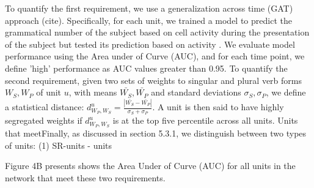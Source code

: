 To quantify the first requirement, we use a generalization across time (GAT) approach (cite). Specifically, for each unit, we trained a model to predict the grammatical number of the subject based on cell activity during the presentation of the subject but tested its prediction based on activity . We evaluate model performance using the Area under of Curve (AUC), and for each time point, we define 'high' performance as AUC values greater than 0.95. To quantify the second requirement, given two sets of weights to singular and plural verb forms $W_S, W_P$ of unit $u$, with means $\bar{W_S}, \bar{W_P}$ and standard deviations $\sigma_S, \sigma_P$, we define a statistical distance: $d^u_{W_P, W_S}=\frac{|\bar{W_S}-\bar{W_P}|}{\sigma_S+\sigma_P}$. A unit is then said to have highly segregated weights if $d^u_{W_P, W_S}$ is at the top five percentile across all units. Units that meetFinally, as discussed in section 5.3.1, we distinguish between two types of units: (1) SR-units - units

Figure 4B presents shows the Area Under of Curve (AUC) for all units in the network that meet these two requirements. 


